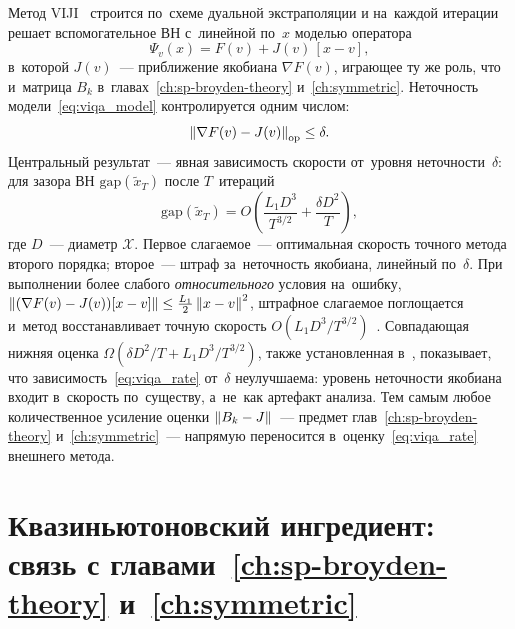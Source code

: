 Метод VIJI~\cite{viqa2024} строится по~схеме дуальной экстраполяции и
на~каждой итерации решает вспомогательное ВН с~линейной по~$x$ моделью
оператора
\begin{equation}\label{eq:viqa_model}
  \Psi_v(x) = F(v) + J(v)\,[x-v],
\end{equation}
в~которой $J(v)$~--- приближение якобиана $\nabla F(v)$, играющее ту же
роль, что и~матрица $B_k$ в~главах~\ref{ch:sp-broyden-theory}
и~\ref{ch:symmetric}. Неточность модели~\eqref{eq:viqa_model}
контролируется одним числом:
\begin{equation}\label{eq:viqa_delta}
  \left\|\nabla F(v) - J(v)\right\|_{\mathrm{op}} \le \delta .
\end{equation}
Центральный результат~--- явная зависимость скорости от~уровня
неточности~$\delta$: для зазора ВН
$\mathrm{gap}(\widetilde{x}_T)$ после $T$~итераций~\cite{viqa2024}
\begin{equation}\label{eq:viqa_rate}
  \mathrm{gap}(\widetilde{x}_T)
  = O\!\left(\frac{L_1 D^3}{T^{3/2}} + \frac{\delta D^2}{T}\right),
\end{equation}
где $D$~--- диаметр $\mathcal{X}$. Первое слагаемое~--- оптимальная
скорость точного метода второго порядка; второе~--- штраф за~неточность
якобиана, линейный по~$\delta$. При выполнении более слабого
\emph{относительного} условия на~ошибку, $\left\|(\nabla F(v)-J(v))[x-v]\right\|
\le \tfrac{L_1}{2}\left\|x-v\right\|^2$, штрафное слагаемое поглощается и~метод
восстанавливает точную скорость $O(L_1 D^3/T^{3/2})$~\cite{viqa2024}.
Совпадающая нижняя оценка $\Omega(\delta D^2/T + L_1 D^3/T^{3/2})$,
также установленная в~\cite{viqa2024}, показывает, что
зависимость~\eqref{eq:viqa_rate} от~$\delta$ неулучшаема: уровень
неточности якобиана входит в~скорость по~существу, а~не~как артефакт
анализа. Тем самым любое количественное усиление оценки
$\left\|B_k-J\right\|$~--- предмет глав~\ref{ch:sp-broyden-theory}
и~\ref{ch:symmetric}~--- напрямую переносится в~оценку~\eqref{eq:viqa_rate}
внешнего метода.

\section{Квазиньютоновский ингредиент: связь с главами~\ref{ch:sp-broyden-theory} и~\ref{ch:symmetric}}\label{sec:viqa_qn}

